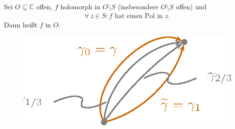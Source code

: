 \documentclass[a4paper,10pt]{scrbook}
\begin{document}
\begin{theorem}[Definition] \label{thm:4.20}
  Sei $O \subseteq \mathbb{C}$ offen, $f$ holomorph in $O \setminus S$ (insbesondere $O \setminus S$ offen) und
  \begin{align*}
    \forall \, z \in S : f \text{ hat einen Pol in } z.
  \end{align*}
  Dann heißt $f$  in $O$.
  \begin{figure}[H]
    \centering
    \includegraphics[scale=0.2]{images/ana3-tmp-40}
  \end{figure}
\end{theorem}

\end{document}
